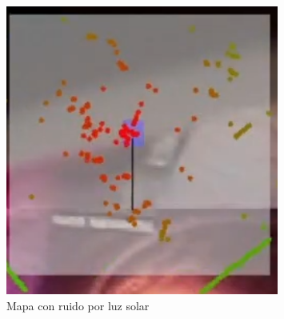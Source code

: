     \vskip 0.5cm
    \begin{figure}[htbp]
        \centering
        \includegraphics[width=0.8\textwidth]{./images/Pruebas/robot/MapaConRuidoSolar.png}
        \caption{Mapa con ruido por luz solar}
        \label{fig:MapaConRuidoLuzSolar}
    \end{figure}
